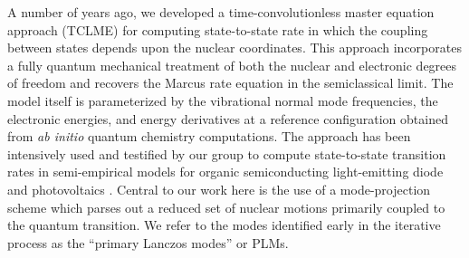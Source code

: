 A number of years ago,  we developed a time-convolutionless  master equation approach (TCLME) for computing
state-to-state rate in which the coupling between  states depends upon the
nuclear coordinates\cite{pereverzev2006time}. This approach incorporates a fully quantum
mechanical treatment of both the nuclear and electronic degrees of freedom and recovers
the Marcus rate equation in the semiclassical limit.  The model itself is parameterized by the
vibrational normal mode frequencies, the electronic energies, and energy derivatives
at a reference configuration obtained from {\em ab initio} quantum  chemistry computations.
The approach has been intensively used and testified by our group to compute state-to-state
transition rates in semi-empirical models for organic semiconducting light-emitting diode and photovoltaics
\cite{tamura2008phonon,tamura2007exciton,singh2009fluorescence,bittner2014noise}.
Central to our work here is the use of a mode-projection scheme
 which parses out a
reduced set of nuclear motions primarily coupled to the quantum transition.
We refer to the modes identified early in the iterative process as the ``primary Lanczos modes'' or PLMs.

